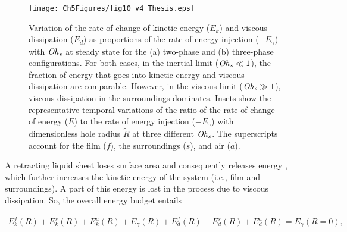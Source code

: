 \begin{figure}
	\centering
	\texttt{[image: Ch5Figures/fig10\_v4\_Thesis.eps]}
	\caption{Variation of the rate of change of kinetic energy ($\dot{E}_k$) and viscous dissipation ($\dot{E}_d$) as proportions of the rate of energy injection ($-\dot{E}_\gamma$) with $\mathit{Oh}_\mathit{s}$ at steady state for the (a) two-phase and (b) three-phase configurations. For both cases, in the inertial limit ($\mathit{Oh}_\mathit{s} \ll 1$), the fraction of energy that goes into kinetic energy and viscous dissipation are comparable. However, in the viscous limit ($\mathit{Oh}_\mathit{s} \gg 1$), viscous dissipation in the surroundings dominates. Insets show the representative temporal variations of the ratio of the rate of change of energy ($\dot{E}$) to the rate of energy injection ($-\dot{E}_{\gamma}$) with dimensionless hole radius $\tilde{R}$ at three different $\mathit{Oh}_\mathit{s}$.  The superscripts account for the film ($f$), the surroundings ($s$), and air ($a$). }
	\label{fig:energy_rate}
\end{figure}

A retracting liquid sheet loses surface area and consequently releases energy \citep{dupre1867theorie, dupre1869theorie, rayleigh-1891-nature, culick-1960-japplphys}, which further increases the kinetic energy of the system (i.e., film and surroundings). A part of this energy is lost in the process due to viscous dissipation. So, the overall energy budget entails

\begin{align}
	E_k^f(R) + E_k^s(R) + E_k^a(R) + E_\gamma(R) + E_d^f(R) + E_d^s(R) + E_d^a(R) = E_\gamma(R = 0),
	\label{Eqn::OverallEnergyBalance}
\end{align}

